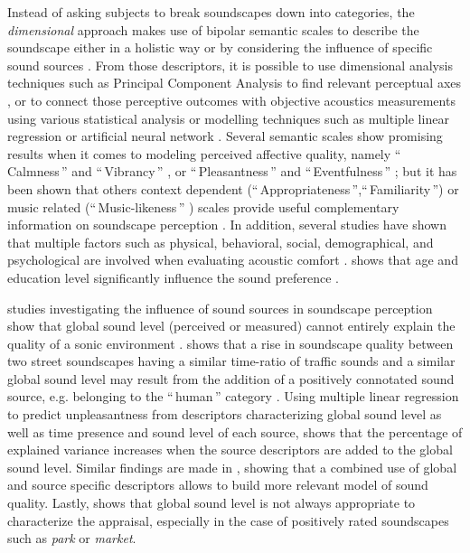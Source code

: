 \documentclass[twoside,twocolumn]{article}
\begin{document}
Instead of asking subjects to break soundscapes down into categories, the \textit{dimensional} approach makes use of bipolar semantic scales to describe the soundscape either in a holistic way \cite{jeon2013soundwalk, kang_semantic_2010, cain_development_2013, torija2013application} or by considering the influence of specific sound sources \cite{guyot2005urban, lavandier2006contribution, ricciardi2015sound}. From those descriptors, it is possible to use dimensional analysis techniques such as Principal Component Analysis to find relevant perceptual axes \cite{cain_development_2013}, or to connect those perceptive outcomes with objective acoustics measurements using various statistical analysis or modelling techniques such as multiple linear regression \cite{lavandier2006contribution,ricciardi2015sound} or artificial neural network \cite{yu2009modeling}. Several semantic scales show promising results when it comes to modeling perceived affective quality, namely ``\,Calmness\,'' and ``\,Vibrancy\,'' \cite{cain_development_2013, axelsson2010principal}, or ``\,Pleasantness\,'' and ``\,Eventfulness\,'' \cite{axelsson2010principal}; but it has been shown that others context dependent (``\,Appropriateness\,'',``\,Familiarity\,'') or music related (``\,Music-likeness\,'' ) scales provide useful complementary information on soundscape perception \cite{aletta2016soundscape}. In addition, several studies have shown that multiple factors such as physical, behavioral, social, demographical, and psychological are involved when evaluating acoustic comfort \cite{marquis2005noise, yu2009modeling}.  \cite{yu2010factors} shows that age and education level significantly influence the sound preference .
 
 studies investigating the influence of sound sources in soundscape perception show that global sound level (perceived or measured) cannot entirely explain the quality of a sonic environment . \cite{guyot2005urban} shows that a rise in soundscape quality between two street soundscapes having a similar time-ratio of traffic sounds and a similar global sound level may result from the addition of a positively connotated sound source, e.g. belonging to the ``\,human\,'' category . Using multiple linear regression to predict unpleasantness from descriptors characterizing global sound level as well as time presence and sound level of each source, \cite{lavandier2006contribution} shows that the percentage of explained variance increases when the source descriptors are added to the global sound level. Similar findings are made in \cite{ricciardi2015sound}, showing that a combined use of global and source specific descriptors allows to build more relevant model of sound quality. Lastly, \cite{lavandier2006contribution} shows that global sound level is not always appropriate to characterize the appraisal, especially in the case of positively rated soundscapes such as \textit{park} or \textit{market}. 
\end{document}
